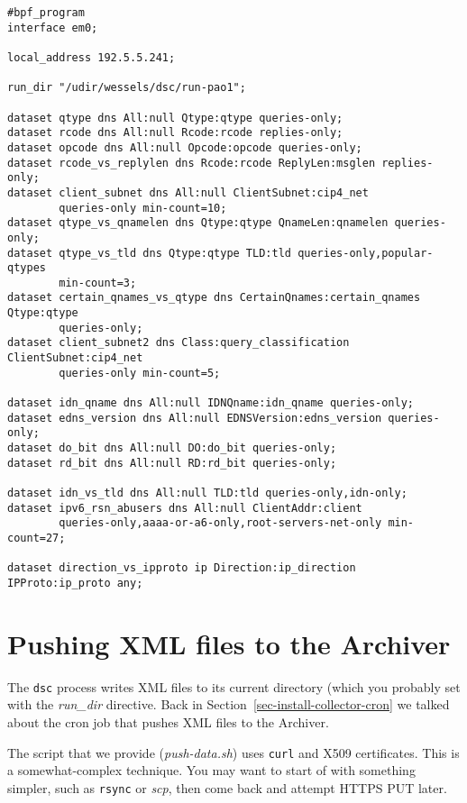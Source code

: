 \documentclass{report}
\begin{document}
\begin{footnotesize}
\begin{verbatim}
#bpf_program
interface em0;

local_address 192.5.5.241;

run_dir "/udir/wessels/dsc/run-pao1";

dataset qtype dns All:null Qtype:qtype queries-only;
dataset rcode dns All:null Rcode:rcode replies-only;
dataset opcode dns All:null Opcode:opcode queries-only;
dataset rcode_vs_replylen dns Rcode:rcode ReplyLen:msglen replies-only;
dataset client_subnet dns All:null ClientSubnet:cip4_net
        queries-only min-count=10;
dataset qtype_vs_qnamelen dns Qtype:qtype QnameLen:qnamelen queries-only;
dataset qtype_vs_tld dns Qtype:qtype TLD:tld queries-only,popular-qtypes
        min-count=3;
dataset certain_qnames_vs_qtype dns CertainQnames:certain_qnames Qtype:qtype
        queries-only;
dataset client_subnet2 dns Class:query_classification ClientSubnet:cip4_net
        queries-only min-count=5;

dataset idn_qname dns All:null IDNQname:idn_qname queries-only;
dataset edns_version dns All:null EDNSVersion:edns_version queries-only;
dataset do_bit dns All:null DO:do_bit queries-only;
dataset rd_bit dns All:null RD:rd_bit queries-only;

dataset idn_vs_tld dns All:null TLD:tld queries-only,idn-only;
dataset ipv6_rsn_abusers dns All:null ClientAddr:client
        queries-only,aaaa-or-a6-only,root-servers-net-only min-count=27;

dataset direction_vs_ipproto ip Direction:ip_direction IPProto:ip_proto any;
\end{verbatim}
\end{footnotesize}

\noindent\hrulefill

\section{Pushing XML files to the Archiver}

The {\tt dsc\/} process writes XML files to its current directory
(which you probably set with the {\em run\_dir\/} directive.  Back
in Section~\ref{sec-install-collector-cron} we talked about the
cron job that pushes XML files to the Archiver.

The script that we provide ({\em push-data.sh\/}) uses {\tt curl\/}
and X509 certificates.  This is a somewhat-complex technique.  You
may want to start of with something simpler, such as {\tt rsync\/}
or {\em scp\/}, then come back and attempt HTTPS PUT later.
\end{document}
